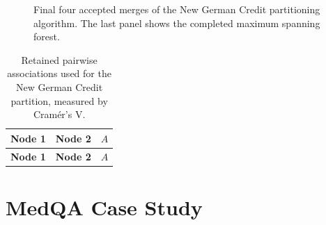 \begin{figure}[p]
  \centering
  \begin{minipage}[t]{0.49\textwidth}\centering
  \end{minipage}\hfill
  \begin{minipage}[t]{0.49\textwidth}\centering
  \end{minipage}

  \vspace{0.4em}
  \begin{minipage}[t]{0.49\textwidth}\centering
  \end{minipage}\hfill
  \begin{minipage}[t]{0.49\textwidth}\centering
  \end{minipage}
  \caption[New German Credit partitioning: final four merges]{Final four accepted merges of the New German Credit partitioning algorithm. The last panel shows the completed maximum spanning forest.}
  \label{fig:credit-grouping-steps-b}
\end{figure}
\FloatBarrier

\begingroup
\small
\newcommand{\CreditNode}[5]{%
  \expandafter\def\csname CreditAppendixNodeLabel@#1\endcsname{#2}%
}
\newcommand{\CreditEdge}[5]{}

\renewcommand{\CreditNode}[5]{}
\renewcommand{\CreditEdge}[5]{%
  \csname CreditAppendixNodeLabel@#1\endcsname &
  \csname CreditAppendixNodeLabel@#2\endcsname & #3\tabularnewline
}
\begin{longtable}{@{}p{}p{}>{\raggedleft\arraybackslash}p{}@{}}
  \caption[Retained pairwise associations for the New German Credit partition]{Retained pairwise associations used for the New German Credit partition, measured by Cram\'er's V.}
  \label{tab:credit-associations}\\
  \hline
  \textbf{Node 1} & \textbf{Node 2} & \textbf{$A$}\\
  \hline
  \endfirsthead
  \hline
  \textbf{Node 1} & \textbf{Node 2} & \textbf{$A$}\\
  \hline
  \endhead
  
\end{longtable}
\endgroup
\clearpage

\section{MedQA Case Study}
\label{app:rq5-oracle-partition}

